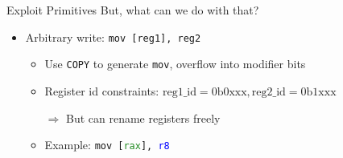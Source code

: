 \documentclass[usenames,dvipsnames]{beamer}
\begin{document}
    \begin{frame}{Exploit Primitives}
        But, what can we do with that?
        \begin{itemize}
            \item Arbitrary write: \lstinline{mov [reg1], reg2}
             {
                \begin{itemize}
                    \item Use \lstinline{COPY} to generate \lstinline{mov}, overflow into modifier bits
                    \item Register id constraints: $\text{reg1\_id} = 0\text{b}0\text{xxx}, \text{reg2\_id}=0\text{b}1\text{xxx}$
                    \item[$\Rightarrow$] But can rename registers freely
                    \item Example: \texttt{mov [\textcolor{ForestGreen}{rax}], \textcolor{blue}{r8}}
                \end{itemize}

}
\end{itemize}
\end{frame}
\end{document}
